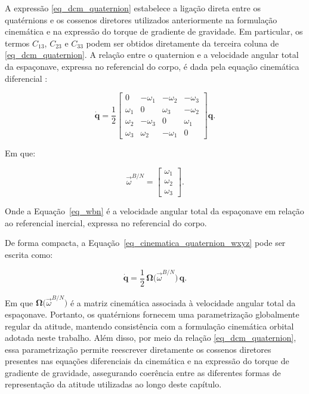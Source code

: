 A expressão \eqref{eq_dcm_quaternion} estabelece a ligação direta entre os quatérnions e os cossenos diretores utilizados anteriormente na formulação cinemática e na expressão do torque de gradiente de gravidade. Em particular, os termos $C_{13}$, $C_{23}$ e $C_{33}$ podem ser obtidos diretamente da terceira coluna de \eqref{eq_dcm_quaternion}.
A relação entre o quaternion e a velocidade angular total da espaçonave, expressa no referencial do corpo, é dada pela equação cinemática diferencial \cite{wie2008space}:

\begin{equation}
\dot{\mathbf{q}}
=
\frac{1}{2}
\begin{bmatrix}
0 & -\omega_1 & -\omega_2 & -\omega_3 \\
\omega_1 & 0 & \omega_3 & -\omega_2 \\
\omega_2 & -\omega_3 & 0 & \omega_1 \\
\omega_3 & \omega_2 & -\omega_1 & 0
\end{bmatrix}
\mathbf{q}.
\label{eq_cinematica_quaternion_wxyz}
\end{equation}

Em que:

\begin{equation}
    \label{eq_wbn}
\vec{\omega}^{B/N}=
\begin{bmatrix}
\omega_1 \\
\omega_2 \\
\omega_3
\end{bmatrix}.
\end{equation}

Onde a Equação~\ref{eq_wbn} é a velocidade angular total da espaçonave em relação ao referencial inercial, expressa no referencial do corpo.

De forma compacta, a Equação~\eqref{eq_cinematica_quaternion_wxyz} pode ser escrita como:

\begin{equation}
\dot{\mathbf{q}}=\frac{1}{2}\,\boldsymbol{\Omega}\big(\vec{\omega}^{B/N}\big)\,\mathbf{q}.
\label{eq_quat_compacta}
\end{equation}

Em que $\boldsymbol{\Omega}\big(\vec{\omega}^{B/N}\big)$ é a matriz cinemática associada à velocidade angular total da espaçonave.
Portanto, os quatérnions fornecem uma parametrização globalmente regular da atitude, mantendo consistência com a formulação cinemática orbital adotada neste trabalho. Além disso, por meio da relação \eqref{eq_dcm_quaternion}, essa parametrização permite reescrever diretamente os cossenos diretores presentes nas equações diferenciais da cinemática e na expressão do torque de gradiente de gravidade, assegurando coerência entre as diferentes formas de representação da atitude utilizadas ao longo deste capítulo.